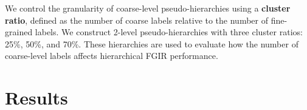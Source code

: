 \documentclass[10pt,twocolumn,letterpaper]{article}
\begin{document}
We control the granularity of coarse-level pseudo-hierarchies using a \textbf{cluster ratio}, defined as the number of coarse labels relative to the number of fine-grained labels. We construct 2-level pseudo-hierarchies with three cluster ratios: 25\%, 50\%, and 70\%. These hierarchies are used to evaluate how the number of coarse-level labels affects hierarchical FGIR performance.

\section{Results}
\label{sec_results}

\end{document}
